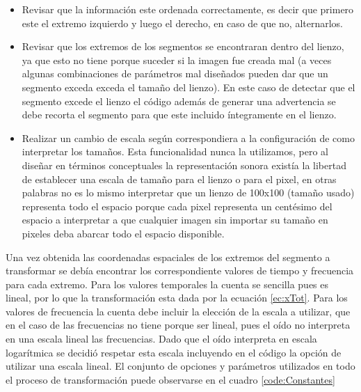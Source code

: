 \documentclass{article}
\begin{document}
    \begin{itemize}
        \item Revisar que la información este ordenada correctamente, es decir que primero este el extremo izquierdo y luego el derecho, en caso de que no, alternarlos. 
        \item Revisar que los extremos de los segmentos se encontraran dentro del lienzo, ya que esto no tiene porque suceder si la imagen fue creada mal (a veces algunas combinaciones de parámetros mal diseñados pueden dar que un segmento exceda exceda el tamaño del lienzo). En este caso de detectar que el segmento excede el lienzo el código además de generar una advertencia se debe recorta el segmento para que este incluido íntegramente en el lienzo.
        \item Realizar un cambio de escala según correspondiera a la configuración de como interpretar los tamaños. Esta funcionalidad nunca la utilizamos, pero al diseñar en términos conceptuales la representación sonora existía la libertad de establecer una escala de tamaño para el lienzo o para el pixel, en otras palabras no es lo mismo interpretar que un lienzo de 100x100 (tamaño usado) representa todo el espacio porque cada pixel representa un centésimo del espacio a interpretar a que cualquier imagen sin importar su tamaño en pixeles deba abarcar todo el espacio disponible. 
    \end{itemize}
    
    Una vez obtenida las coordenadas espaciales de los extremos del segmento a transformar se debía encontrar los correspondiente valores de tiempo y frecuencia para cada extremo. Para los valores temporales la cuenta se sencilla pues es lineal, por lo que la transformación esta dada por la ecuación \ref{ec:xTot}. Para los valores de frecuencia la cuenta debe incluir la elección de la escala a utilizar, que en el caso de las frecuencias no tiene porque ser lineal, pues el oído no interpreta en una escala lineal las frecuencias. Dado que el oído interpreta en escala logarítmica se decidió respetar esta escala incluyendo en el código la opción de utilizar una escala lineal. El conjunto de opciones y parámetros utilizados en todo el proceso de transformación puede observarse en el cuadro \ref{code:Constantes}
\end{document}
